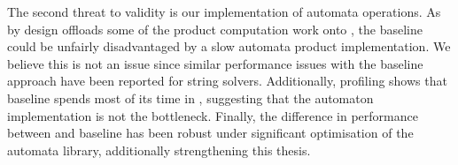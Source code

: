 The second threat to validity is our implementation of automata operations. As
\Calculus{} by design offloads some of the product computation work onto
\Princess{}, the baseline could be unfairly disadvantaged by a slow automata
product implementation. We believe this is not an issue since similar
performance issues with the baseline approach have been reported for string
solvers. Additionally, profiling shows that baseline spends most of its time in
\Princess{}, suggesting that the automaton implementation is not the bottleneck.
Finally, the difference in performance between \Calculus{} and baseline has been
robust under significant optimisation of the automata library, additionally
strengthening this thesis.

